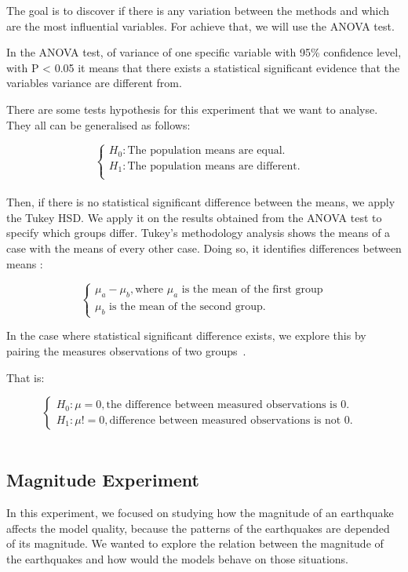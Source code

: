 The goal is to discover if there is any variation between the methods and which are the most influential variables. For achieve that, we will use the ANOVA test.

In the ANOVA test, of variance of one specific variable with  95\% confidence level, with P < 0.05 it means that there exists a statistical significant evidence that the variables variance are different from.

There are some tests hypothesis for this experiment that we want to analyse. They all can be generalised as follows:

$$\begin{cases} H_0: \text{The population means are equal.} &\\
H_1: \text{The population means are different.}&\\
\end{cases}$$\\

Then, if there is no statistical significant difference between the means, we apply the Tukey HSD. We apply it on the results obtained from the ANOVA test to specify which groups differ. 
Tukey's methodology analysis shows the means of a case with the means of every other case. Doing so, it identifies differences between means :

$$\begin{cases}
\mu_a-\mu_b, \text{where $\mu_a$ is the mean of the first group}\\
                \text{$\mu_b$ is the mean of the second group.}
\end{cases}$$

In the case where statistical significant difference exists, we explore this by pairing the measures observations of two groups~\cite{Campelo2015-01}.

That is:

$$\begin{cases}
H_0: \mu = 0, \text{the difference between measured observations is 0.}&\\
H_1: \mu != 0, \text{difference between measured observations is not 0.}
\end{cases}$$\\

\subsection{Magnitude Experiment}\label{magExp}

In this experiment, we focused on studying how the magnitude of an earthquake affects the model quality, because the patterns of the earthquakes are depended of its magnitude. We wanted to explore the relation between the magnitude of the earthquakes and how would the models behave on those situations.

